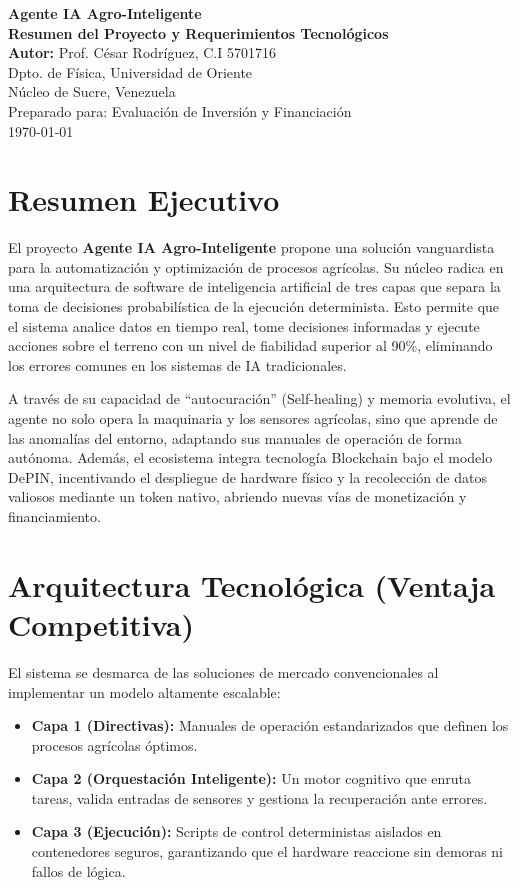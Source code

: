 \documentclass[12pt,a4paper]{article}
\begin{document}
\begin{center}
    {\Huge \textbf{\color{darkgreen} Agente IA Agro-Inteligente}} \\[0.5cm]
    {\Large \textbf{Resumen del Proyecto y Requerimientos Tecnológicos}} \\[1cm]
    {\large \textbf{Autor:} Prof. César Rodríguez, C.I 5701716} \\
    {\small Dpto. de Física, Universidad de Oriente} \\
    {\small Núcleo de Sucre, Venezuela} \\[0.5cm]
    {\large Preparado para: Evaluación de Inversión y Financiación} \\[0.5cm]
    {\large \today}
\end{center}

\vspace{1cm}

\section{Resumen Ejecutivo}
El proyecto \textbf{Agente IA Agro-Inteligente} propone una solución vanguardista para la automatización y optimización de procesos agrícolas. Su núcleo radica en una arquitectura de software de inteligencia artificial de tres capas que separa la toma de decisiones probabilística de la ejecución determinista. Esto permite que el sistema analice datos en tiempo real, tome decisiones informadas y ejecute acciones sobre el terreno con un nivel de fiabilidad superior al 90\%, eliminando los errores comunes en los sistemas de IA tradicionales.

A través de su capacidad de ``autocuración'' (Self-healing) y memoria evolutiva, el agente no solo opera la maquinaria y los sensores agrícolas, sino que aprende de las anomalías del entorno, adaptando sus manuales de operación de forma autónoma. Además, el ecosistema integra tecnología Blockchain bajo el modelo DePIN, incentivando el despliegue de hardware físico y la recolección de datos valiosos mediante un token nativo, abriendo nuevas vías de monetización y financiamiento.

\section{Arquitectura Tecnológica (Ventaja Competitiva)}
El sistema se desmarca de las soluciones de mercado convencionales al implementar un modelo altamente escalable:
\begin{itemize}[label=$\bullet$]
    \item \textbf{Capa 1 (Directivas):} Manuales de operación estandarizados que definen los procesos agrícolas óptimos.
    \item \textbf{Capa 2 (Orquestación Inteligente):} Un motor cognitivo que enruta tareas, valida entradas de sensores y gestiona la recuperación ante errores.
    \item \textbf{Capa 3 (Ejecución):} Scripts de control deterministas aislados en contenedores seguros, garantizando que el hardware reaccione sin demoras ni fallos de lógica.
\end{itemize}
\end{document}
